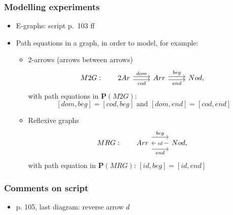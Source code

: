 \documentclass[handout]{beamer}
\newcommand{\bfsf}[1]{{\boldsymbol{#1}}}
\newcommand{\PP}{\bfsf{P}}
\begin{document}
\frame
  {   
    \frametitle{Modelling experiments}\label{Ch3:Modelling}

 \begin{itemize}[<+->]
\item E-graphs: script p.\ 103 ff
\item Path equations in a graph, in order to model, for example:
   \begin{itemize}[<+->]
\item 2-arrows (arrows between arrows)
\[M2G:~~~~~ 
\begin{tikzcd}[ampersand replacement=\&]
2Ar \arrow[yshift=0.5ex]{r}{dom} \arrow[swap, yshift=-0.5ex]{r}{cod} \& Arr \arrow[yshift=0.5ex]{r}{beg} \arrow[swap, yshift=-0.5ex]{r}{end} \& Nod,
\end{tikzcd}\]
with path equations in $\PP(M2G)$:
\[
[dom,beg]=[cod,beg] \text{~and~} [dom,end]=[cod,end]
\] 
\item Reflexive graphs
 \[MRG:~~~~~
\begin{tikzcd}[ampersand replacement=\&]
Arr \arrow[yshift=2ex]{r}{beg} \arrow[swap, yshift=-2ex]{r}{end}  \& \arrow{l}[description]{id} Nod,
\end{tikzcd}\] 
with path equation in $\PP(MRG)$: $[id,beg]=[id,end]$ 
   \end{itemize}

 \end{itemize}

 }

\frame
  {   
    \frametitle{Comments on script}\label{Ch3:comments}

 \begin{itemize}[<+->]
\item p. 105, last diagram: reverse arrow $d$
 \end{itemize}

 }
\end{document}
